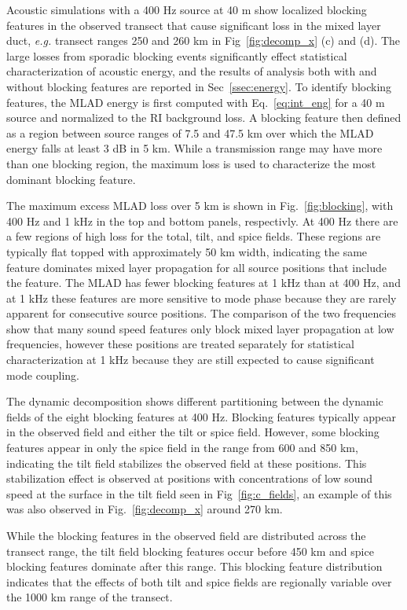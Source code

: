 \documentclass[preprint,NumberedRefs]{JASA}
\begin{document}
Acoustic simulations with a 400 Hz source at 40 m show localized blocking features in the observed transect that cause significant loss in the mixed layer duct, \emph{e.g.} transect ranges 250 and 260 km in Fig~\ref{fig:decomp_x} (c) and (d). The large losses from sporadic blocking events significantly effect statistical characterization of acoustic energy, and the results of analysis both with and without blocking features are reported in Sec~\ref{ssec:energy}. To identify blocking features, the MLAD energy is first computed with Eq.~\eqref{eq:int_eng} for a 40 m source and normalized to the RI background loss. A blocking feature then defined as a region between source ranges of 7.5 and 47.5 km over which the MLAD energy falls at least 3 dB in 5 km. While a transmission range may have more than one blocking region, the maximum loss is used to characterize the most dominant blocking feature.

The maximum excess MLAD loss over 5 km is shown in Fig.~\ref{fig:blocking}, with 400 Hz and 1 kHz in the top and bottom panels, respectivly. At 400 Hz there are a few regions of high loss for the total, tilt, and spice fields. These regions are typically flat topped with approximately 50 km width, indicating the same feature dominates mixed layer propagation for all source positions that include the feature. The MLAD has fewer blocking features at 1 kHz than at 400 Hz, and at 1 kHz these features are more sensitive to mode phase because they are rarely apparent for consecutive source positions. The comparison of the two frequencies show that many sound speed features only block mixed layer propagation at low frequencies, however these positions are treated separately for statistical characterization at 1 kHz because they are still expected to cause significant mode coupling.

The dynamic decomposition shows different partitioning between the dynamic fields of the eight blocking features at 400 Hz. Blocking features typically appear in the observed field and either the tilt or spice field. However, some blocking features appear in only the spice field in the range from 600 and 850 km, indicating the tilt field stabilizes the observed field at these positions. This stabilization effect is observed at positions with concentrations of low sound speed at the surface in the tilt field seen in Fig~\ref{fig:c_fields}, an example of this was also observed in Fig.~\ref{fig:decomp_x} around 270 km.

While the blocking features in the observed field are distributed across the transect range, the tilt field blocking features occur before 450 km and spice blocking features dominate after this range. This blocking feature distribution indicates that the effects of both tilt and spice fields are regionally variable over the 1000 km range of the transect.
\end{document}
